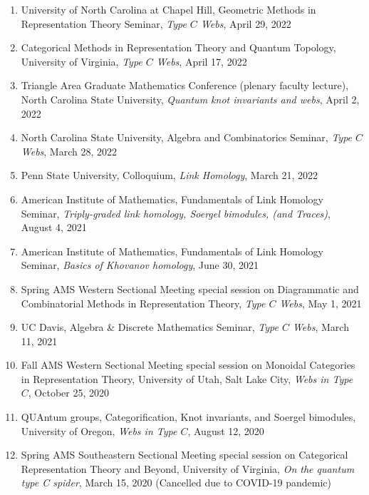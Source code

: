 \documentclass[10pt]{article}
\begin{document}
\begin{enumerate}
\item University of North Carolina at Chapel Hill,
Geometric Methods in Representation Theory Seminar, 
\emph{Type $C$ Webs},
April 29, 2022

\item Categorical Methods in Representation Theory and Quantum Topology,
University of Virginia,
\emph{Type $C$ Webs},
April 17, 2022

\item Triangle Area Graduate Mathematics Conference (plenary faculty lecture), 
North Carolina State University,
\emph{Quantum knot invariants and webs},
April 2, 2022

\item North Carolina State University, Algebra and Combinatorics Seminar, 
\emph{Type $C$ Webs},
March 28, 2022

\item Penn State University, Colloquium, 
\emph{Link Homology},
March 21, 2022

\item American Institute of Mathematics, Fundamentals of Link Homology Seminar,
\emph{Triply-graded link homology, Soergel bimodules, (and Traces)},
August 4, 2021

\item American Institute of Mathematics, Fundamentals of Link Homology Seminar,
\emph{Basics of Khovanov homology},
June 30, 2021

\item Spring AMS Western Sectional Meeting 
special session on Diagrammatic and Combinatorial Methods in Representation Theory, 
\emph{Type $C$ Webs},
May 1, 2021

\item UC Davis, Algebra \& Discrete Mathematics Seminar,
\emph{Type $C$ Webs},
March 11, 2021

\item Fall AMS Western Sectional Meeting 
special session on Monoidal Categories in Representation Theory, 
University of Utah, Salt Lake City, 
\emph{Webs in Type $C$},
October 25, 2020

\item QUAntum groups, Categorification, Knot invariants, and Soergel bimodules,
University of Oregon,
\emph{Webs in Type $C$},
August 12, 2020

\item Spring AMS Southeastern Sectional Meeting 
special session on Categorical Representation Theory and Beyond, 
University of Virginia,
\emph{On the quantum type C spider},
March 15, 2020 (Cancelled due to COVID-19 pandemic)


\end{enumerate}
\end{document}
